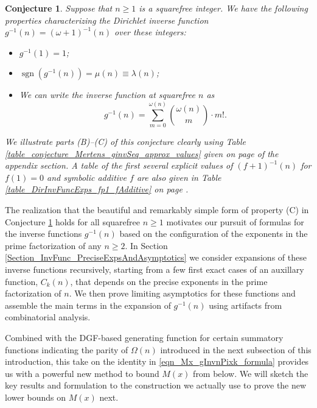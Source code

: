 \documentclass[11pt,reqno,a4letter]{article}
\numberwithin{figure}{section}
\numberwithin{table}{section}
\theoremstyle{plain}
\newtheorem{conjecture}[theorem]{Conjecture}
\numberwithin{theorem}{section}
\theoremstyle{definition}
\begin{document}
\begin{conjecture}
\label{lemma_gInv_MxExample} 
Suppose that $n \geq 1$ is a squarefree integer. We have the following properties characterizing the 
Dirichlet inverse function $g^{-1}(n) = (\omega+1)^{-1}(n)$ over these integers: 
\begin{itemize} 

\item[(A)] $g^{-1}(1) = 1$; 
\item[(B)] $\operatorname{sgn}(g^{-1}(n)) = \mu(n) \equiv \lambda(n)$; 
\item[(C)] We can write the inverse function at squarefree $n$ as 
     \[
     g^{-1}(n) = \sum_{m=0}^{\omega(n)} \binom{\omega(n)}{m} \cdot m!. 
     \]
\end{itemize} 
We illustrate parts (B)--(C) of this conjecture clearly using 
Table \ref{table_conjecture_Mertens_ginvSeq_approx_values} given on 
page \pageref{table_conjecture_Mertens_ginvSeq_approx_values} of the appendix section. 
A table of the first several explicit values of $(f+1)^{-1}(n)$ for $f(1) = 0$ and symbolic 
additive $f$ are also given in Table \ref{table_DirInvFuncExps_fp1_fAdditive} on page 
\pageref{table_DirInvFuncExps_fp1_fAdditive}. 
\end{conjecture} 

The realization that the beautiful and remarkably simple form of property (C) 
in Conjecture \ref{lemma_gInv_MxExample} holds for all squarefree $n \geq 1$ 
motivates our pursuit of formulas for the inverse functions $g^{-1}(n)$ based on the configuration of the 
exponents in the prime factorization of any $n \geq 2$. 
In Section \ref{Section_InvFunc_PreciseExpsAndAsymptotics} we consider expansions of these inverse functions 
recursively, starting from a few first exact cases of an auxillary function, $C_k(n)$, 
that depends on the precise exponents in the prime factorization of $n$. 
We then prove limiting asymptotics for these functions and assemble the main terms in the expansion of 
$g^{-1}(n)$ using artifacts from combinatorial analysis. 

Combined with the DGF-based generating function for certain summatory functions indicating the parity of 
$\Omega(n)$ introduced in the next subsection of this introduction, 
this take on the identity in \eqref{eqn_Mx_gInvnPixk_formula} provides us with a powerful new method to 
bound $M(x)$ from below. 
We will sketch the key results and formulation to the construction we actually use to prove the 
new lower bounds on $M(x)$ next. 
\end{document}
